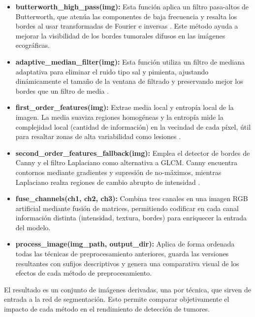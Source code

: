 \documentclass[12pt]{article}
\begin{document}
\begin{itemize}

    \item \textbf{butterworth\_high\_pass(img):} Esta función aplica un filtro pasa-altos de Butterworth, que atenúa las componentes de baja frecuencia y resalta los bordes al usar transformadas de Fourier e inversas \cite{mathworks_butterworth}. Este método ayuda a mejorar la visibilidad de los bordes tumorales difusos en las imágenes ecográficas.

    \item \textbf{adaptive\_median\_filter(img):} Esta función utiliza un filtro de mediana adaptativa para eliminar el ruido tipo sal y pimienta, ajustando dinámicamente el tamaño de la ventana de filtrado y preservando mejor los bordes que un filtro de media \cite{scribd_median_filter}.

    \item \textbf{first\_order\_features(img):} Extrae media local y entropía local de la imagen. La media suaviza regiones homogéneas y la entropía mide la complejidad local (cantidad de información) en la vecindad de cada píxel, útil para resaltar zonas de alta variabilidad como lesiones \cite{skimage_entropy}.

    \item \textbf{second\_order\_features\_fallback(img):} Emplea el detector de bordes de Canny y el filtro Laplaciano como alternativa a GLCM. Canny encuentra contornos mediante gradientes y supresión de no-máximos, mientras Laplaciano realza regiones de cambio abrupto de intensidad \cite{programarfacil_canny}.

    \item \textbf{fuse\_channels(ch1, ch2, ch3):} Combina tres canales en una imagen RGB artificial mediante fusión de matrices, permitiendo codificar en cada canal información distinta (intensidad, textura, bordes) para enriquecer la entrada del modelo.

    \item \textbf{process\_image(img\_path, output\_dir):} Aplica de forma ordenada todas las técnicas de preprocesamiento anteriores, guarda las versiones resultantes con sufijos descriptivos y genera una comparativa visual de los efectos de cada método de preprocesamiento.

\end{itemize}

El resultado es un conjunto de imágenes derivadas, una por técnica, que sirven de entrada a la red de segmentación. Esto permite comparar objetivamente el impacto de cada método en el rendimiento de detección de tumores.
\end{document}
